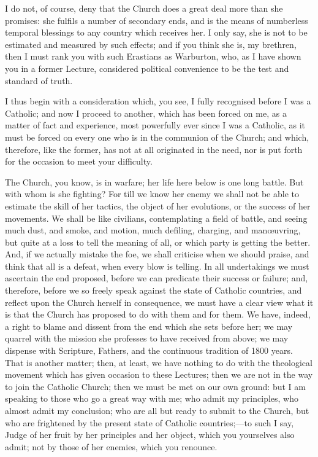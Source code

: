 I do not, of course, deny that the Church does a great deal more
than she promises: she fulfils a number of secondary ends, and is the
means of numberless temporal blessings to any country which receives
her. I only say, she is not to be estimated and measured by such
effects; and if you think she is, my brethren, then I must rank you
with such Erastians as Warburton, who, as I have shown you in a former
Lecture, considered political convenience to be the test and standard
of truth.

I thus begin with a consideration which, you see, I fully
recognised before I was a Catholic; and now I proceed to another,
which has been forced on me, as a matter of fact and experience, most
powerfully ever since I was a Catholic, as it must be forced on every
one who is in the communion of the Church; and which, therefore, like
the former, has not at all originated in the need, nor is put forth
for the occasion to meet your difficulty.

The Church, you know, is in warfare; her life here below is one
long battle. But with whom is she fighting? For till we know her enemy
we shall not be able to estimate the skill of her tactics, the object
of her evolutions, or the success of her movements. We shall be like
civilians, contemplating a field of battle, and seeing much dust, and
smoke, and motion, much defiling, charging, and manœuvring, but quite
at a loss to tell the meaning of all, or which party is getting the
better. And, if we actually mistake the foe, we shall criticise when
we should praise, and think that all is a defeat, when every blow is
telling. In all undertakings we must ascertain the end proposed,
before we can predicate their success or failure; and, therefore,
before we so freely speak against the state of Catholic countries, and
reflect upon the Church herself in consequence, we must have a clear
view what it is that the Church has proposed to do with them and for
them. We have, indeed, a right to blame and dissent from the end which
she sets before her; we may quarrel with the mission she professes to
have received from above; we may dispense with Scripture, Fathers, and
the continuous tradition of 1800 years. That is another matter; then,
at least, we have nothing to do with the theological movement which
has given occasion to these Lectures; then we are not in the way to
join the Catholic Church; then we must be met on our own ground: but I
am speaking to those who go a great way with me; who admit my
principles, who almost admit my conclusion; who are all but ready to
submit to the Church, but who are frightened by the present state of
Catholic countries;—to such I say, Judge of her fruit by her
principles and her object, which you yourselves also admit; not by
those of her enemies, which you renounce.


